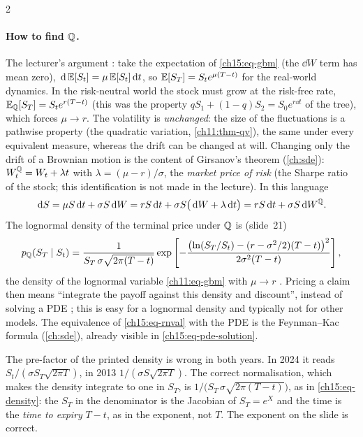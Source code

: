 \begin{paracol}{2}
\paragraph{How to find $\mathbb{Q}$.} The lecturer's argument : take the expectation of \eqref{ch15:eq-gbm} (the
$\dd W$ term has mean zero), $\,\mathrm{d}\,\mathbb{E}[S_t]=\mu\,\mathbb{E}[S_t]\,\mathrm{d} t$, so $\mathbb{E}[S_T]=S_te^{\mu(T-t)}$ for the real-world dynamics. In the risk-neutral
world the stock must grow at the risk-free rate, $\mathbb{E}_{\mathbb{Q}}[S_T]=S_te^{r(T-t)}$ (this was the property $qS_1+(1-q)S_2=S_0e^{r\dd t}$ of the tree), which forces $\mu\to r$.
The volatility is \emph{unchanged}: the size of the fluctuations is a pathwise property (the quadratic variation, \cref{ch11:thm-qv}), the same under every equivalent measure, whereas the drift
can be changed at will. Changing only the drift of a Brownian motion is the content of Girsanov's theorem (\cref{ch:sde}): $W^{\mathbb{Q}}_t=W_t+\lambda t$ with
$\lambda=(\mu-r)/\sigma$, the \emph{market price of risk} (the Sharpe ratio of the stock; this identification is not made in the lecture). In this language
\begin{equation}\label{ch15:eq-girsanov}
  \,\mathrm{d} S=\mu S\,\mathrm{d} t+\sigma S\,\mathrm{d} W=rS\,\mathrm{d} t+\sigma S\bigl(\,\mathrm{d} W+\lambda\,\mathrm{d} t\bigr)=rS\,\mathrm{d} t+\sigma S\,\mathrm{d} W^{\mathbb{Q}}.
\end{equation}
The lognormal density of the terminal price under $\mathbb{Q}$ is (slide~21)
\begin{equation}\label{ch15:eq-density}
  p_{\mathbb{Q}}(S_T\mid S_t)=\frac1{S_T\,\sigma\sqrt{2\pi(T-t)}}\exp\left[-\frac{\bigl(\ln(S_T/S_t)-(r-\sigma^2/2)(T-t)\bigr)^2}{2\sigma^2(T-t)}\right],
\end{equation}
the density of the lognormal variable \cref{ch11:eq-gbm} with $\mu\to r$ . Pricing a claim then means ``integrate the payoff against this density and discount'', instead of solving
a PDE ; this is easy for a lognormal density and typically not for other models. The equivalence of \eqref{ch15:eq-rnval} with the PDE is the Feynman--Kac
formula (\cref{ch:sde}), already visible in \eqref{ch15:eq-pde-solution}.

\begin{coursenote}
The pre-factor of the printed density is wrong in both years. In 2024 it reads $S_t/(\sigma S_T\sqrt{2\pi T})$, in 2013 $1/(\sigma S\sqrt{2\pi T})$. The correct normalisation, which makes the density integrate to one
in $S_T$, is $1/\bigl(S_T\,\sigma\sqrt{2\pi(T-t)}\bigr)$, as in \eqref{ch15:eq-density}: the $S_T$ in the denominator is the Jacobian of $S_T=e^{X}$ and the time is the \emph{time to expiry}
$T-t$, as in the exponent, not $T$. The exponent on the slide is correct.
\end{coursenote}


\end{paracol}
